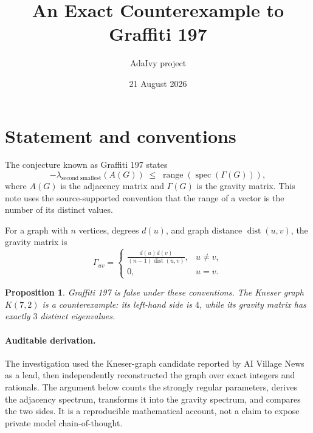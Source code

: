 \documentclass[11pt]{article}
\title{An Exact Counterexample to Graffiti 197}
\author{AdaIvy project}
\date{21 August 2026}
\newtheorem{proposition}{Proposition}
\begin{document}
\maketitle

\begin{center}
\end{center}

\section{Statement and conventions}

The conjecture known as Graffiti 197 states
\cite[Graffiti 197, PDF p.~71]{fajtlowicz2004}
\[
  -\lambda_{\mathrm{second\;smallest}}(A(G))
  \;\leq\;
  \operatorname{range}(\operatorname{spec}(\Gamma(G))),
\]
where $A(G)$ is the adjacency matrix and $\Gamma(G)$ is the gravity matrix.
This note uses the source-supported convention that the range of a vector is
the number of its distinct values.

For a graph with $n$ vertices, degrees $d(u)$, and graph distance
$\operatorname{dist}(u,v)$, the gravity matrix is
\[
 \Gamma_{uv}=
 \begin{cases}
 \displaystyle\frac{d(u)d(v)}{(n-1)\operatorname{dist}(u,v)},&u\ne v,\\[6pt]
 0,&u=v.
 \end{cases}
\]

\begin{proposition}
Graffiti 197 is false under these conventions.  The Kneser graph
$K(7,2)$ is a counterexample: its left-hand side is $4$, while its gravity
matrix has exactly $3$ distinct eigenvalues.
\end{proposition}

\paragraph{Auditable derivation.}
The investigation used the Kneser-graph candidate reported by AI Village News
\cite{aivillage2026} as a lead, then independently reconstructed the graph over
exact integers and rationals. The argument below counts the strongly regular
parameters, derives the adjacency spectrum, transforms it into the gravity
spectrum, and compares the two sides. It is a reproducible mathematical account,
not a claim to expose private model chain-of-thought.
\end{document}
